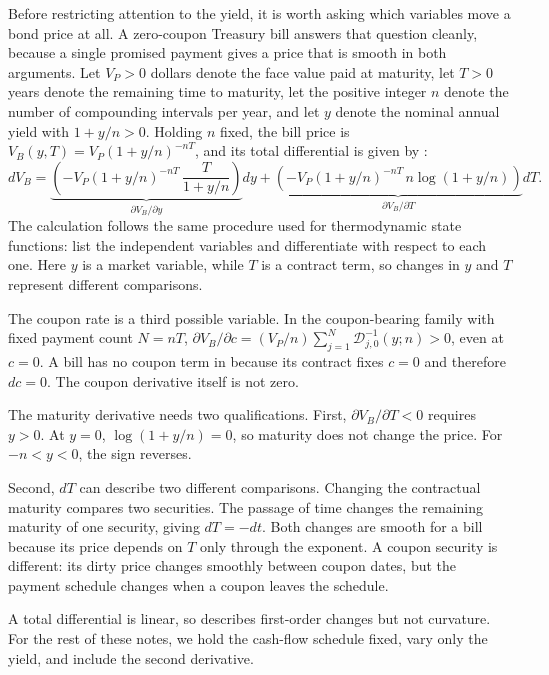 \documentclass[11pt]{article}
\newcommand{\B}{V_{B}}
\begin{document}
Before restricting attention to the yield, it is worth asking which variables move a bond price at all. A zero-coupon Treasury bill answers that question cleanly, because a single promised payment gives a price that is smooth in both arguments. Let $V_P>0$ dollars denote the face value paid at maturity, let $T>0$ years denote the remaining time to maturity, let the positive integer $n$ denote the number of compounding intervals per year, and let $y$ denote the nominal annual yield with $1+y/n>0$. Holding $n$ fixed, the bill price is $\B(y,T)=V_P\left(1+y/n\right)^{-nT}$, and its total differential is given by :
\begin{equation}
  \label{eq:bill-differential}
  d\B
  =\underbrace{\left(-V_P\left(1+y/n\right)^{-nT}\,\frac{T}{1+y/n}\right)}_{\partial\B/\partial y}dy
  +\underbrace{\left(-V_P\left(1+y/n\right)^{-nT}\,n\log\left(1+y/n\right)\right)}_{\partial\B/\partial T}dT.
\end{equation}
The calculation follows the same procedure used for thermodynamic state functions: list the independent variables and differentiate with respect to each one. Here $y$ is a market variable, while $T$ is a contract term, so changes in $y$ and $T$ represent different comparisons.

The coupon rate is a third possible variable. In the coupon-bearing family with fixed payment count $N=nT$, $\partial\B/\partial c=(V_P/n)\sum_{j=1}^{N}\mathcal D_{j,0}^{-1}(y;n)>0$, even at $c=0$. A bill has no coupon term in  because its contract fixes $c=0$ and therefore $dc=0$. The coupon derivative itself is not zero.

The maturity derivative needs two qualifications. First, $\partial\B/\partial T<0$ requires $y>0$. At $y=0$, $\log\left(1+y/n\right)=0$, so maturity does not change the price. For $-n<y<0$, the sign reverses.

Second, $dT$ can describe two different comparisons. Changing the contractual maturity compares two securities. The passage of time changes the remaining maturity of one security, giving $dT=-dt$. Both changes are smooth for a bill because its price depends on $T$ only through the exponent. A coupon security is different: its dirty price changes smoothly between coupon dates, but the payment schedule changes when a coupon leaves the schedule.

A total differential is linear, so  describes first-order changes but not curvature. For the rest of these notes, we hold the cash-flow schedule fixed, vary only the yield, and include the second derivative.
\end{document}
